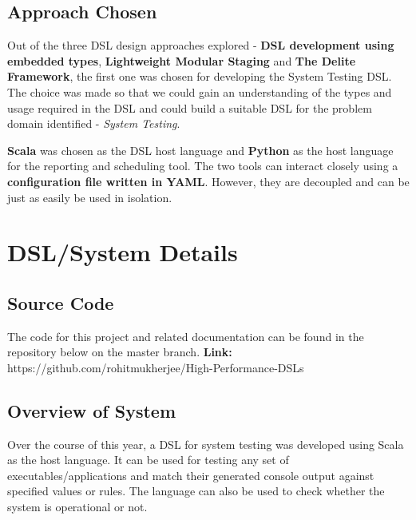 \documentclass[12pt]{article}
\begin{document}
\subsection{Approach Chosen}
Out of the three DSL design approaches explored - \textbf{DSL development using embedded types}, \textbf{Lightweight Modular Staging} and \textbf{The Delite Framework}, the first one was chosen for developing the System Testing DSL. The choice was made so that we could gain an understanding of the types and usage required in the DSL and could build a suitable DSL for the problem domain identified - \textit{System Testing}.
\bigskip

\noindent
\textbf{Scala} was chosen as the DSL host language and \textbf{Python} as the host language for the reporting and scheduling tool. The two tools can interact closely using a \textbf{configuration file written in YAML}. However, they are decoupled and can be just as easily be used in isolation.
\newpage

\section{DSL/System Details}

\subsection{Source Code}
The code for this project and related documentation can be found in the repository below on the master branch.\newline
\textbf{Link:} https://github.com/rohitmukherjee/High-Performance-DSLs

\subsection{Overview of System}
Over the course of this year, a DSL for system testing was developed using Scala as the host language. It can be used for testing any set of executables/applications and match their generated console output against specified values or rules. The language can also be used to check whether the system is operational or not.
\bigskip
\end{document}
